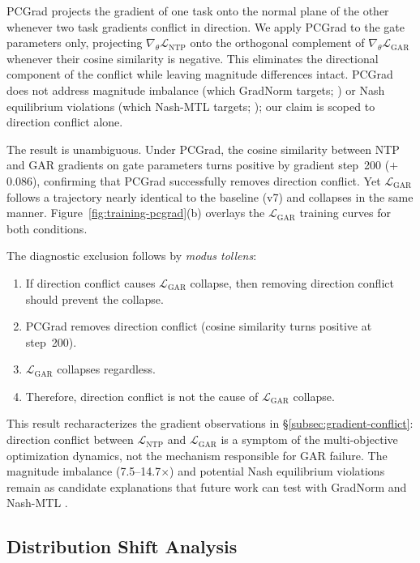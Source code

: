 PCGrad projects the gradient of one task onto the normal plane of the other whenever two task gradients conflict in direction. We apply PCGrad to the gate parameters only, projecting $\nabla_\theta \mathcal{L}_\text{NTP}$ onto the orthogonal complement of $\nabla_\theta \mathcal{L}_\text{GAR}$ whenever their cosine similarity is negative. This eliminates the directional component of the conflict while leaving magnitude differences intact. PCGrad does not address magnitude imbalance (which GradNorm targets; \citealp{chen2018gradnorm}) or Nash equilibrium violations (which Nash-MTL targets; \citealp{navon2022nash}); our claim is scoped to direction conflict alone.

The result is unambiguous. Under PCGrad, the cosine similarity between NTP and GAR gradients on gate parameters turns positive by gradient step~200 ($+$0.086), confirming that PCGrad successfully removes direction conflict. Yet $\mathcal{L}_\text{GAR}$ follows a trajectory nearly identical to the baseline (v7) and collapses in the same manner. Figure~\ref{fig:training-pcgrad}(b) overlays the $\mathcal{L}_\text{GAR}$ training curves for both conditions.

The diagnostic exclusion follows by \emph{modus tollens}:
\begin{enumerate}
    \item If direction conflict causes $\mathcal{L}_\text{GAR}$ collapse, then removing direction conflict should prevent the collapse.
    \item PCGrad removes direction conflict (cosine similarity turns positive at step~200).
    \item $\mathcal{L}_\text{GAR}$ collapses regardless.
    \item Therefore, direction conflict is not the cause of $\mathcal{L}_\text{GAR}$ collapse.
\end{enumerate}

This result recharacterizes the gradient observations in \S\ref{subsec:gradient-conflict}: direction conflict between $\mathcal{L}_\text{NTP}$ and $\mathcal{L}_\text{GAR}$ is a symptom of the multi-objective optimization dynamics, not the mechanism responsible for GAR failure. The magnitude imbalance (7.5--14.7$\times$) and potential Nash equilibrium violations remain as candidate explanations that future work can test with GradNorm \citep{chen2018gradnorm} and Nash-MTL \citep{navon2022nash}.

\subsection{Distribution Shift Analysis}\label{subsec:dist-shift}

